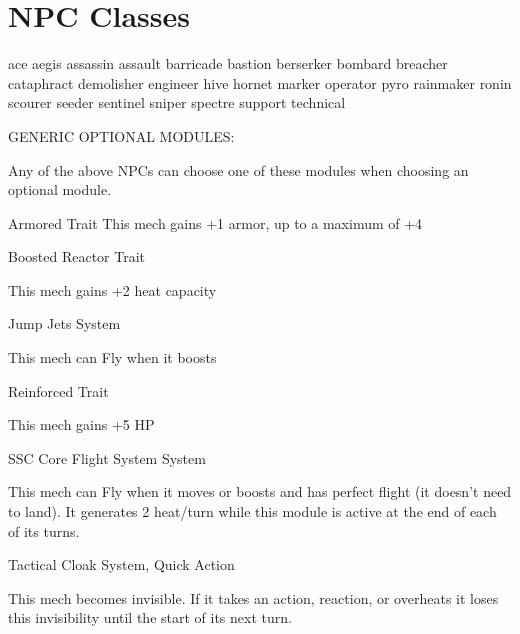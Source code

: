 \section{NPC Classes}

{ace}
{aegis}
{assassin}
{assault}
{barricade}
{bastion}
{berserker}
{bombard}
{breacher}
{cataphract}
{demolisher}
{engineer}
{hive}
{hornet}
{marker}
{operator}
{pyro}
{rainmaker}
{ronin}
{scourer}
{seeder}
{sentinel}
{sniper}
{spectre}
{support}
{technical}

                                     GENERIC OPTIONAL MODULES:

Any of the above NPCs can choose one of these modules when choosing an optional module.


Armored
Trait
This mech gains +1 armor, up to a maximum of +4


Boosted Reactor
Trait

This mech gains +2 heat capacity


Jump Jets
System

This mech can Fly when it boosts


Reinforced
Trait

This mech gains +5 HP


SSC Core Flight System
System

This mech can Fly when it moves or boosts and has perfect flight (it doesn’t need to land). It
generates 2 heat/turn while this module is active at the end of each of its turns.


Tactical Cloak
System, Quick Action

This mech becomes invisible. If it takes an action, reaction, or overheats it loses this invisibility
until the start of its next turn.